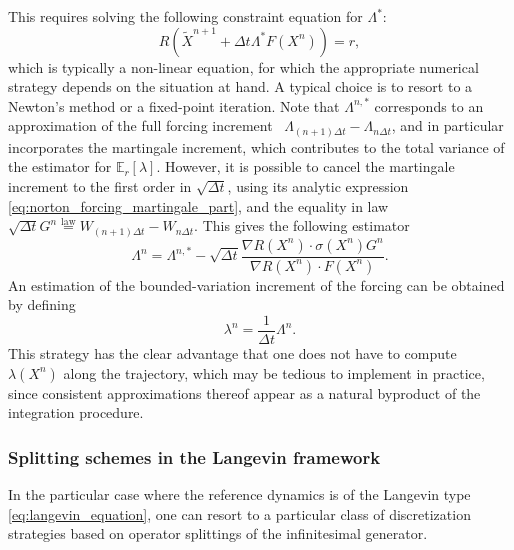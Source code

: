 \documentclass[pdflatex,sn-mathphys]{sn-jnl}%
\theoremstyle{thmstyleone}%
\theoremstyle{thmstyletwo}%
\theoremstyle{thmstylethree}%
\newcommand{\1}{\mathbbm{1}}
\newcommand{\Dt}{{\Delta t}}
\begin{document}
This requires solving the following constraint equation for $\Lambda^*$:
\[R\left(\widetilde{X}^{n+1} +\Delta t\Lambda^{*} F(X^n)\right)=r,\]
which is typically a non-linear equation, for which the appropriate numerical strategy depends on the situation at hand. A typical choice is to resort to a Newton's method or a fixed-point iteration.
Note that $\Lambda^{n,*}$ corresponds to an approximation of the full forcing increment ~$\Lambda_{(n+1)\Delta t}-\Lambda_{n\Delta t}$, and in particular incorporates the martingale increment, which contributes to the total variance of the estimator for $\mathbb{E}_r[\lambda]$.
However, it is possible to cancel the martingale increment to the first order in $\sqrt{\Delta t}$, using its analytic expression \eqref{eq:norton_forcing_martingale_part}, and the equality in law $\sqrt{\Delta t} G^n \overset{\mathrm{law}}{=}W_{(n+1)\Delta t}-W_{n\Delta t}$. This gives the following estimator
\[\Lambda^{n} = \Lambda^{n,*}-\sqrt{\Dt}\frac{\nabla R(X^n)\cdot \sigma(X^n)G^n}{\nabla R(X^n)\cdot F(X^n)}.\]
An estimation of the bounded-variation increment of the forcing can be obtained by defining
\begin{equation}
    \label{eq:norton_lambda_n_definition}
    \lambda^{n} = \frac{1}{\Dt}\Lambda^n.
\end{equation}
This strategy has the clear advantage that one does not have to compute $\lambda(X^n)$ along the trajectory, which may be tedious to implement in practice, since consistent approximations thereof appear as a natural byproduct of the integration procedure.

\subsubsection{Splitting schemes in the Langevin framework}
In the particular case where the reference dynamics is of the Langevin type \eqref{eq:langevin_equation}, one can resort to a particular class of discretization strategies based on operator splittings of the infinitesimal generator.
\end{document}
